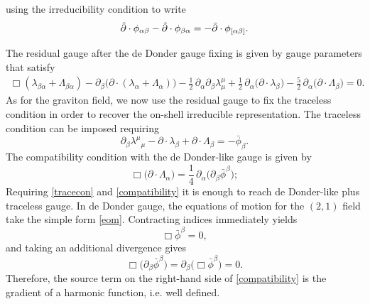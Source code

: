 \documentclass[a4paper,12pt]{article}
\begin{document}
using the irreducibility condition to write 
\begin{equation}
    \hat{\partial} \cdot \phi_{ \alpha \beta}-\hat{\partial} \cdot \phi_{  \beta \alpha}=-\Bar{\partial} \cdot \phi_{[\alpha \beta]}.
    \label{barcap}
\end{equation}

The residual gauge after the de Donder gauge fixing is given by gauge parameters that satisfy
\begin{equation}
\begin{aligned}
\Box (\lambda_{\beta\alpha}+ \Lambda_{\beta\alpha})
-\partial_{\beta}\bigl(\partial\!\cdot\!(\lambda_{\alpha}+
\Lambda_{\alpha})\bigr)
-\frac{1}{2}\,\partial_{\alpha}\partial_{\beta}\lambda^{\mu}_{\mu}
+\frac{1}{2}\,\partial_{\alpha}\bigl(\partial\!\cdot\!\lambda_{\beta}\bigr)
-\frac{5}{2}\,\partial_{\alpha}\bigl(\partial\!\cdot\!\Lambda_{\beta}\bigr)=0 .
\end{aligned}
\end{equation} 
As for the graviton field, we now use the residual gauge to fix the traceless condition in order to recover the on-shell irreducible representation. The traceless condition can be imposed requiring
\begin{equation}
\partial_{\beta}\lambda^{\mu}{}_{\mu}
-\partial\!\cdot\!\lambda_{\beta}
+\partial\!\cdot\!\Lambda_{\beta}
= -\bar{\phi}_{\beta} .
\label{tracecon}
\end{equation}
The compatibility condition with the de Donder-like gauge is given by
\begin{equation}
\Box\bigl(\partial\!\cdot\!\Lambda_{\alpha}\bigr)
=\frac{1}{4}\,\partial_{\alpha}
\bigl(\partial_{\beta}\bar{\phi}^{\beta}\bigr);
\label{compatibility}
\end{equation}
Requiring \eqref{tracecon} and \eqref{compatibility} it is enough to reach de Donder-like plus traceless gauge.
In de Donder gauge, the equations of motion for the \((2,1)\) field take the simple form \eqref{eom}.
Contracting indices immediately yields
\begin{equation}
\Box \bar{\phi}^{\beta}=0,
\label{eom_trace}
\end{equation}
and taking an additional divergence gives
\begin{equation}
\Box\bigl(\partial_{\beta}\bar{\phi}^{\beta}\bigr)
=\partial_{\beta}\bigl(\Box\bar{\phi}^{\beta}\bigr)=0.
\label{eom_div_trace}
\end{equation}
Therefore, the source term on the right-hand side of
\eqref{compatibility}
is the gradient of a harmonic function, i.e. well defined.
\end{document}
